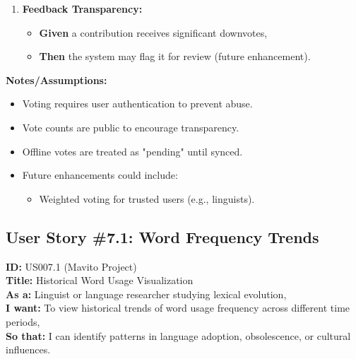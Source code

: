 \documentclass[12pt]{article}
\begin{document}
\begin{enumerate}
    \item \textbf{Feedback Transparency:}
    \begin{itemize}
        \item \textbf{Given} a contribution receives significant downvotes,
        \item \textbf{Then} the system may flag it for review (future enhancement).
    \end{itemize}
\end{enumerate}

\vspace{1em}
\textbf{Notes/Assumptions:}
\begin{itemize}
    \item Voting requires user authentication to prevent abuse.
    \item Vote counts are public to encourage transparency.
    \item Offline votes are treated as "pending" until synced.
    \item Future enhancements could include:
    \begin{itemize}
        \item Weighted voting for trusted users (e.g., linguists).
    \end{itemize}
\end{itemize}


\subsection{User Story \#7.1: Word Frequency Trends}

\textbf{ID:} US007.1 (Mavito Project) \\
\textbf{Title:} Historical Word Usage Visualization \\
\textbf{As a:} Linguist or language researcher studying lexical evolution, \\
\textbf{I want:} To view historical trends of word usage frequency across different time periods, \\
\textbf{So that:} I can identify patterns in language adoption, obsolescence, or cultural influences.
\end{document}
